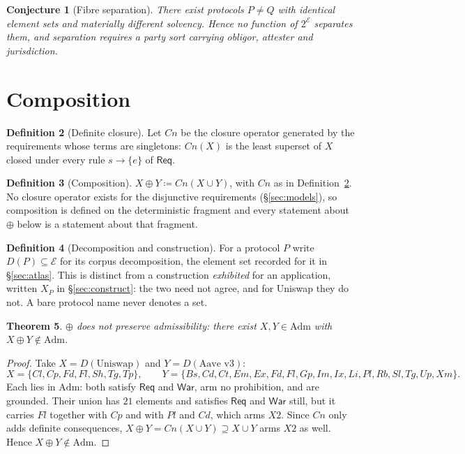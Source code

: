 \documentclass[11pt,reqno]{amsart}
\theoremstyle{plain}
\newtheorem{theorem}{Theorem}[section]
\newtheorem{conjecture}[theorem]{Conjecture}
\theoremstyle{definition}
\newtheorem{definition}[theorem]{Definition}
\theoremstyle{remark}
\newcommand{\Admf}{\mathrm{Adm}}
\newcommand{\El}{\mathcal{E}}
\newcommand{\Law}{\mathsf{Req}}
\newcommand{\War}{\mathsf{War}}
\begin{document}
\begin{conjecture}[Fibre separation]\label{conj:fibre}
There exist protocols $P \neq Q$ with identical element sets and materially
different solvency. Hence no function of $2^{\El}$ separates them, and separation
requires a party sort carrying obligor, attester and jurisdiction.
\end{conjecture}

\section{Composition}

\begin{definition}[Definite closure]\label{def:cn}
Let $Cn$ be the closure operator generated by the requirements whose terms are
singletons: $Cn(X)$ is the least superset of $X$ closed under every rule
$s \to \{e\}$ of $\Law$.
\end{definition}

\begin{definition}[Composition]\label{def:oplus}
$X \oplus Y \coloneqq Cn(X \cup Y)$, with $Cn$ as in
Definition~\ref{def:cn}. No closure operator exists for the disjunctive
requirements (\S\ref{sec:models}), so composition is defined on the deterministic
fragment and every statement about $\oplus$ below is a statement about that
fragment.
\end{definition}

\begin{definition}[Decomposition and construction]\label{not:decomp}
For a protocol $P$ write $D(P) \subseteq \El$ for its corpus decomposition, the
element set recorded for it in \S\ref{sec:atlas}. This is distinct from a
construction \emph{exhibited} for an application, written $X_{P}$ in
\S\ref{sec:construct}: the two need not agree, and for Uniswap they do not.
A bare protocol name never denotes a set.
\end{definition}

\begin{theorem}\label{thm:noncong}
$\oplus$ does not preserve admissibility: there exist $X, Y \in \Admf$ with
$X \oplus Y \notin \Admf$.
\end{theorem}

\begin{proof}
Take $X = D(\text{Uniswap})$ and $Y = D(\text{Aave v3})$:
\[
  X = \{Cl,Cp,Fd,Fl,Sh,Tg,Tp\}, \qquad
  Y = \{Bs,Cd,Ct,Em,Ex,Fd,Fl,Gp,Im,Ix,Li,Pl,Rb,Sl,Tg,Up,Xm\}.
\]
Each lies in $\Admf$: both satisfy $\Law$ and $\War$, arm no prohibition, and
are grounded. Their union has $21$ elements and satisfies $\Law$ and $\War$
still, but it carries $Fl$ together with $Cp$ and with $Pl$ and $Cd$, which arms
$X2$. Since $Cn$ only adds definite consequences, $X \oplus Y = Cn(X \cup Y)
\supseteq X \cup Y$ arms $X2$ as well. Hence $X \oplus Y \notin \Admf$.
\end{proof}
\end{document}
